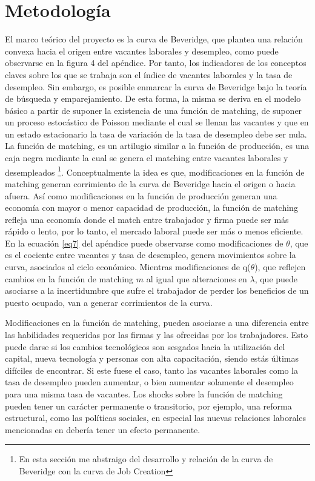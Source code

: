 \chapter{Metodología}


El marco teórico del proyecto es la curva de Beveridge, que plantea una relación convexa hacia el origen entre vacantes laborales y desempleo, como puede observarse en la figura 4 del apéndice. Por tanto, los indicadores de los conceptos claves sobre los que se trabaja son el índice de vacantes laborales y la tasa de desempleo. Sin embargo, es posible enmarcar la curva de Beveridge bajo la teoría de búsqueda y emparejamiento. De esta forma, la misma se deriva en el modelo básico \cite{Pissarides2000} a partir de suponer la existencia de una función de matching, de suponer un proceso estocástico de Poisson mediante el cual se llenan las vacantes y que en un estado estacionario la tasa de variación de la tasa de desempleo debe ser nula. La función de matching, es un artilugio similar a la función de producción, es una caja negra mediante la cual se genera el matching entre vacantes laborales y desempleados \cite{Pissarides2000}\footnote{En esta sección me abstraigo del desarrollo y relación de la curva de Beveridge con la curva de Job Creation}. Conceptualmente la idea es que, modificaciones en la función de matching generan corrimiento de la curva de Beveridge hacia el origen o hacia afuera. Así como modificaciones en la función de producción generan una economía con mayor o menor capacidad de producción, la función de matching refleja una economía donde el match entre trabajador y firma puede ser más rápido o lento, por lo tanto, el mercado laboral puede ser más o menos eficiente. En la ecuación \eqref{eq7} del apéndice puede observarse como modificaciones de $\theta$, que es el cociente entre vacantes y tasa de desempleo, genera movimientos sobre la curva, asociados al ciclo económico. Mientras modificaciones de q($\theta$), que reflejen cambios en la función de matching $m$ al igual que alteraciones en $\lambda$, que puede asociarse a la incertidumbre que sufre el trabajador de perder los beneficios de un puesto ocupado, van a generar corrimientos de la curva.

Modificaciones en la función de matching, pueden asociarse a una diferencia entre las habilidades requeridas por las firmas y las ofrecidas por los trabajadores. Esto puede darse si los cambios tecnológicos son sesgados hacia la utilización del capital, nueva tecnología y personas con alta capacitación, siendo estás últimas difíciles de encontrar. Si este fuese el caso, tanto las vacantes laborales como la tasa de desempleo pueden aumentar, o bien aumentar solamente el desempleo para una misma tasa de vacantes. Los shocks sobre la función de matching pueden tener un carácter permanente o transitorio, por ejemplo, una reforma estructural, como las políticas sociales, en especial las nuevas relaciones laborales mencionadas en \cite{Bergara2017} debería tener un efecto permanente.


